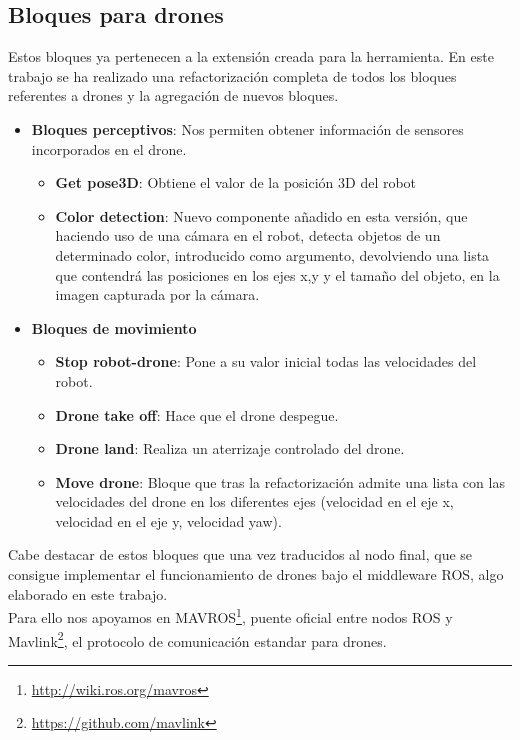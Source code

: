 \subsection{Bloques para drones}
Estos bloques ya pertenecen a la extensión creada para la herramienta.
En este trabajo se ha realizado una refactorización completa de todos los bloques referentes a drones y la agregación de nuevos bloques. 
\begin{itemize}
\item \textbf{Bloques perceptivos}:
Nos permiten obtener información de sensores incorporados en el drone.
	\begin{itemize}
	\item \textbf{Get pose3D}: Obtiene el valor de la posición 3D del robot
	\item \textbf{Color detection}: Nuevo componente añadido en esta versión, que haciendo uso de una cámara en el robot, detecta objetos de un determinado color, introducido como argumento, devolviendo una lista que contendrá las posiciones en los ejes x,y y el tamaño del objeto, en la imagen capturada por la cámara. 
	\end{itemize}
\item \textbf{Bloques de movimiento}
	\begin{itemize}
	\item \textbf{Stop robot-drone}: Pone a su valor inicial todas las velocidades del robot.
	\item \textbf{Drone take off}: Hace que el drone despegue.
	\item \textbf{Drone land}: Realiza un aterrizaje controlado del drone.
	\item \textbf{Move drone}: Bloque que tras la refactorización admite una lista con las velocidades del drone en los diferentes ejes (velocidad en el eje x, velocidad en el eje y, velocidad yaw).
	\end{itemize}
\end{itemize}

Cabe destacar de estos bloques que una vez traducidos al nodo final, que se consigue implementar el funcionamiento de drones bajo el middleware ROS, algo elaborado en este trabajo.\\

Para ello nos apoyamos en MAVROS\footnote{\url{http://wiki.ros.org/mavros}}, puente oficial entre nodos ROS y Mavlink\footnote{\url{https://github.com/mavlink}}, el protocolo de comunicación estandar para drones.

